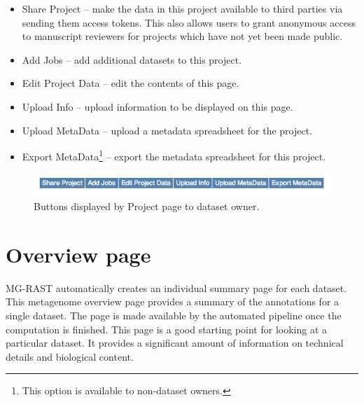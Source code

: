 \documentclass[12pt,fullpage]{report}
\begin{document}
\begin{itemize}
\item Share Project --
make the data in this project available to third parties via sending them access tokens. This also allows users to grant anonymous access to manuscript reviewers for projects which have not yet been made public.

\item Add Jobs --
add additional datasets to this project.

\item Edit Project Data --
edit the contents of this page.

\item Upload Info --
upload information to be displayed on this page.

\item Upload MetaData --
upload a metadata spreadsheet for the project.

\item Export MetaData\footnote{This option is available to non-dataset owners.} --
export the metadata spreadsheet for this project.

\end{itemize}

\begin{figure}
\begin{center}
\includegraphics[width=6in]{Images/project-page-editing-buttons.png}
\end{center}
\caption{
Buttons displayed by Project page to
dataset owner.}
\label{fig:project-page-editing-buttons}
\end{figure}
\section{Overview page}

MG-RAST automatically creates an individual summary page for each dataset. This metagenome overview page provides a summary of the annotations for a single dataset. The page is made available by the automated pipeline once the computation is finished.
This page is a good starting point for looking at a particular dataset. It provides a significant amount of information on technical details and biological content.
\end{document}
